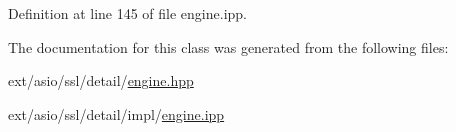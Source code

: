 Definition at line 145 of file engine.\+ipp.



The documentation for this class was generated from the following files\+:\begin{DoxyCompactItemize}
\item 
ext/asio/ssl/detail/\hyperlink{engine_8hpp}{engine.\+hpp}\item 
ext/asio/ssl/detail/impl/\hyperlink{engine_8ipp}{engine.\+ipp}\end{DoxyCompactItemize}
